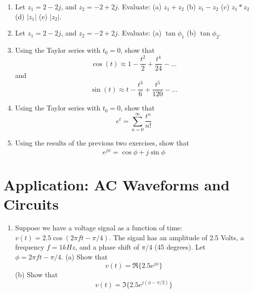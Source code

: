 \documentclass{article}
\begin{document}
\begin{enumerate}
\item Let $z_1 = 2 - 2j$, and $z_2 = -2 + 2j$.  Evaluate: (a) $z_1 + z_2$ (b) $z_1 - z_2$ (c) $z_1 * z_2$ (d) $|z_1|$ (e) $|z_2|$. \\ \vspace{4cm}
\item Let $z_1 = 2 - 2j$, and $z_2 = -2 + 2j$.  Evaluate: (a) $\tan\phi_1$ (b) $\tan\phi_2$. \\ \vspace{2cm}
\item Using the Taylor series with $t_0 = 0$, show that
\begin{equation}
\cos(t) \approx 1 - \frac{t^2}{2} + \frac{t^4}{24} - ...
\end{equation}
and
\begin{equation}
\sin(t) \approx t - \frac{t^3}{6} + \frac{t^5}{120} - ...
\end{equation}
\vspace{3cm}
\item Using the Taylor series with $t_0 = 0$, show that
\begin{equation}
e^t = \sum_{n=0}^{\infty} \frac{t^n}{n!}
\end{equation}
\item Using the results of the previous two exercises, show that 
\begin{equation}
e^{j\phi} = \cos\phi +  j\sin\phi
\end{equation}
\vspace{2cm}
\end{enumerate}

\section{Application: AC Waveforms and Circuits}

\begin{enumerate}
\item Suppose we have a voltage signal as a function of time: $v(t) = 2.5 \cos(2\pi ft - \pi/4)$.  The siganl has an amplitude of 2.5 Volts, a frequency $f = 1 kHz$, and a phase shift of $\pi/4$ (45 degrees).  Let $\phi = 2\pi ft - \pi/4$.  (a) Show that 
\begin{equation}
v(t) = \Re \lbrace 2.5 e^{j\phi} \rbrace
\end{equation}
(b) Show that 
\begin{equation}
v(t) = \Im \lbrace 2.5 e^{j(\phi-\pi/2)} \rbrace
\end{equation}
\end{enumerate}
\end{document}
